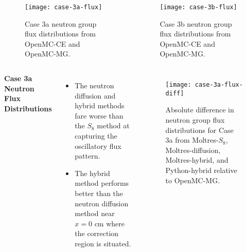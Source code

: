 \begin{frame}
  \begin{columns}
    \column{5.5cm}
    \begin{figure}[htb!]
      \centering
      \texttt{[image: case-3a-flux]}
      \caption{Case 3a neutron group flux distributions from OpenMC-CE and OpenMC-MG.}
      \label{fig:3a-flux}
    \end{figure}
    \column{5.5cm}
    \begin{figure}[htb!]
      \centering
      \texttt{[image: case-3b-flux]}
      \caption{Case 3b neutron group flux distributions from OpenMC-CE and OpenMC-MG.}
      \label{fig:3b-flux}
    \end{figure}
  \end{columns}
\end{frame}

\begin{frame}
  \begin{columns}
    \column{5.5cm}
    \textbf{Case 3a Neutron Flux Distributions}
    \begin{itemize}
      \item The neutron diffusion and hybrid methods fare worse than the $S_8$ method at capturing
        the oscillatory flux pattern.
      \item The hybrid method performs better than the neutron diffusion method near $x=0$ cm where
        the correction region is situated.
    \end{itemize}
    \column{5.5cm}
    \begin{figure}[htb!]
      \centering
      \texttt{[image: case-3a-flux-diff]}
      \caption{Absolute difference in neutron group flux distributions for Case 3a from Moltres-$S_8$,
      Moltres-diffusion, Moltres-hybrid, and Python-hybrid relative to OpenMC-MG.}
      \label{fig:3a-flux-diff}
    \end{figure}
  \end{columns}
\end{frame}

